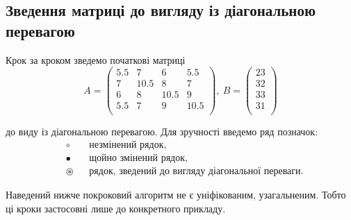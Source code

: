 \documentclass[a4paper,14pt]{extarticle} %
\begin{document}
\subsection*{Зведення матриці до вигляду із діагональною перевагою}
Крок за кроком зведемо початкові матриці
\begin{equation} A =
    \begin{pmatrix}
        5.5 & 7 & 6 & 5.5 \\
        7 & 10.5 & 8 & 7 \\
        6 & 8 & 10.5 & 9 \\
        5.5 & 7 & 9 & 10.5 \\
    \end{pmatrix},\
    B = 
    \begin{pmatrix}
        23 \\
        32 \\
        33 \\
        31 \\
    \end{pmatrix}
\end{equation}

до виду із діагональною перевагою. Для зручності введемо ряд позначок: 
\begin{align*}
    &\circ &&\text{незмінений рядок,} \\
    &\bullet &&\text{щойно змінений рядок,} \\
    &\circledast &&\text{рядок, зведений до вигляду діагональної переваги.}
\end{align*}

Наведений нижче покроковий алгоритм не є уніфікованим, узагальненим. Тобто ці кроки застосовні лише до конкретного прикладу. 
\end{document}
